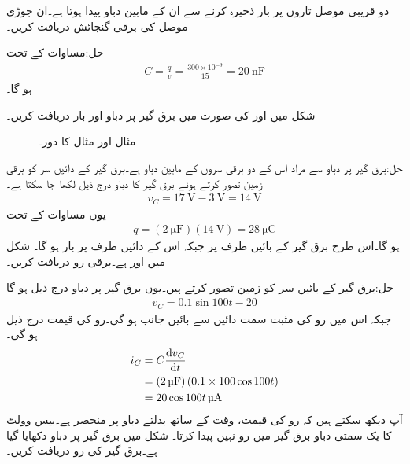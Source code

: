 
دو  قریبی موصل تاروں پر  بار ذخیرہ کرنے سے ان کے مابین  دباو پیدا ہوتا ہے۔ان جوڑی موصل کی برقی گنجائش دریافت کریں۔

حل:مساوات  کے تحت
\begin{align*}
C=\frac{q}{v}=\frac{300 \times 10^{-9}}{15}=\SI{20}{\nano\farad}
\end{align*}
ہو گا۔ 

\FloatBarrier
شکل  میں  اور  کی صورت میں برق گیر پر دباو اور بار دریافت کریں۔
\begin{figure}
\centering
{}
\caption{مثال  اور مثال  کا دور۔}
\label{شکل_مثال_امالہ_برق_گیر_دباو_رو_تعلق_الف}
\end{figure}

حل:برق گیر پر دباو سے مراد اس کے دو برقی سروں کے مابین دباو ہے۔برق گیر کے دائیں سر کو برقی زمین تصور کرتے ہوئے  برق گیر کا دباو درج ذیل لکھا جا سکتا ہے۔
\begin{align*}
v_C=\SI{17}{\volt}-\SI{3}{\volt}=\SI{14}{\volt}
\end{align*}
یوں مساوات  کے تحت
\begin{align*}
q=\left(\SI{2}{\micro\farad}\right)\left(\SI{14}{\volt}\right)=\SI{28}{\micro\coulomb}
\end{align*}
ہو گا۔اس طرح برق گیر کے بائیں طرف پر  جبکہ اس کے دائیں طرف پر  بار ہو گا۔
شکل  میں  اور  ہے۔برقی رو دریافت کریں۔

حل:برق گیر کے بائیں سر کو زمین تصور کرتے ہیں۔یوں برق گیر پر دباو  درج ذیل ہو گا
\begin{align*}
v_C=0.1\sin 100t -20
\end{align*}
جبکہ اس میں رو کی مثبت سمت دائیں سے بائیں جانب ہو گی۔رو کی قیمت درج ذیل ہو گی۔
\begin{align*}
i_C&=C\frac{\dif v_C}{\dif t}\\
&=\left(\SI{2}{\micro\farad}\right)\left(0.1\times 100 \cos 100 t\right)\\
&=20 \cos 100 t \, \si{\micro\ampere}
\end{align*}
آپ دیکھ سکتے ہیں کہ رو کی قیمت، وقت کے ساتھ بدلتے دباو پر منحصر ہے۔بیس وولٹ کا یک سمتی دباو برق گیر میں رو نہیں پیدا کرتا۔  
شکل میں  برق گیر پر دباو دکھایا گیا ہے۔برق گیر کی رو دریافت کریں۔

